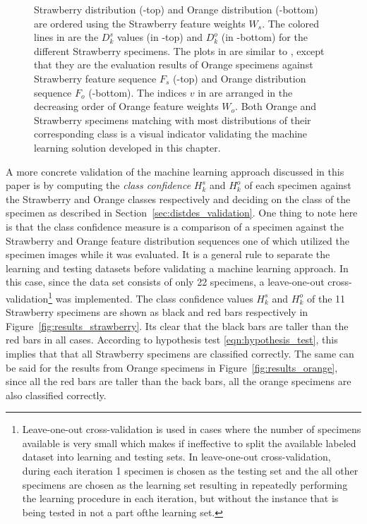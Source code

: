\documentclass {udthesis}
\begin{document}
\begin{figure}
{Strawberry distribution (-top) and Orange distribution (-bottom) are ordered using the Strawberry feature weights $W_s$. The colored lines in  are the $D^s_k$ values (in -top) and $D^o_k$ (in -bottom) for the different Strawberry specimens. 
The plots in  are similar to , except that they are the evaluation results of Orange specimens against Strawberry feature sequence $F_s$ (-top) and Orange distribution sequence $F_o$ (-bottom). The indices $v$ in  are arranged in the decreasing order of Orange feature weights $W_o$. Both Orange and Strawberry specimens matching with most distributions of their corresponding class is a visual indicator validating the machine learning solution developed in this chapter.}
\label{fig:feat_results}
\end{figure}	
%

A more concrete validation of the machine learning approach discussed in this paper is by computing the \emph{class confidence} $H^s_k$ and $H^o_k$ of each specimen against the Strawberry and Orange classes respectively and deciding on the class of the specimen as described in Section~\ref{sec:distdes_validation}. One thing to note here is that the class confidence measure is a comparison of a specimen against the Strawberry and Orange feature distribution sequences one of which utilized the specimen images while it was evaluated. It is a general rule to separate the learning and testing datasets before validating a machine learning approach. In this case, since the data set consists of only 22 specimens, a leave-one-out cross-validation\footnote{Leave-one-out cross-validation is used in cases where the number of specimens available is very small which makes if ineffective to split the available labeled dataset into learning and testing sets. In leave-one-out cross-validation, during each iteration 1 
specimen is chosen as the testing set and the all other specimens are chosen as the learning set resulting in repeatedly performing the learning procedure in each iteration, but without the instance that is being tested in not a part ofthe learning set.} \cite{alpaydin} was implemented. The class confidence values $H^s_k$ and $H^o_k$ of the 11 Strawberry specimens are shown as black and red bars respectively in Figure~\ref{fig:results_strawberry}. Its clear that the black bars are taller than the red bars in all cases. According to hypothesis test \eqref{eqn:hypothesis_test}, this implies that that all Strawberry specimens are classified correctly. The same can be said for the results from Orange specimens in Figure~\ref{fig:results_orange}, since all the red bars are taller than the back bars, all the orange specimens are also classified correctly.
\end{document}
